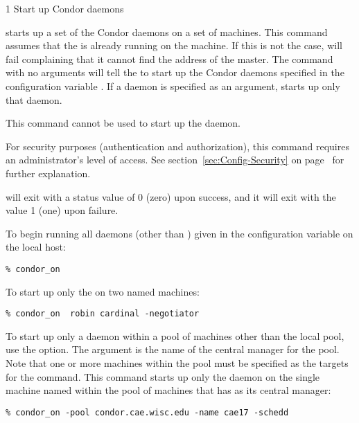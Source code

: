 \begin{ManPage}{\label{man-condor-on}}{1}
{Start up Condor daemons}
\Synopsis {}
\ToolArgsBase

\ToolDebugOption
\ToolArgsLocate \ToolArgsAffect

\ToolDebugOption
\ToolWhere \ToolArgsAffect


\Description 

 starts up a set of the Condor daemons on a set of
machines.
This command assumes that the  is already
running on the machine.
If this is not the case,  will
fail complaining that it cannot find the address of the master.
The command  with no arguments will
tell the  to start up the Condor daemons specified
in the configuration variable .
If a daemon is specified as an argument,
 starts up only that daemon.

This command cannot be used to start up the  daemon.

For security purposes (authentication and authorization),
this command requires an administrator's level of access.
See
section~\ref{sec:Config-Security} on page~\pageref{sec:Config-Security}
for further explanation.

\begin{Options}
	\ToolArgsDesc
	\ToolDebugDesc
\end{Options}

\ExitStatus

 will exit with a status value of 0 (zero) upon success,
and it will exit with the value 1 (one) upon failure.

\Examples
To begin running all daemons (other than ) given
in the configuration variable 
on the local host:
\begin{verbatim}
% condor_on
\end{verbatim}

To start up only the  on two named machines:
\begin{verbatim}
% condor_on  robin cardinal -negotiator
\end{verbatim}

To start up only a daemon within a pool of machines
other than the local pool, use the  option.
The argument is the name of the central manager for the pool.
Note that one or more machines within the pool must be
specified as the targets for the command.
This command starts up only the  daemon
on the single machine named  within the
pool of machines that has  as
its central manager:
\begin{verbatim}
% condor_on -pool condor.cae.wisc.edu -name cae17 -schedd
\end{verbatim}

\end{ManPage}
